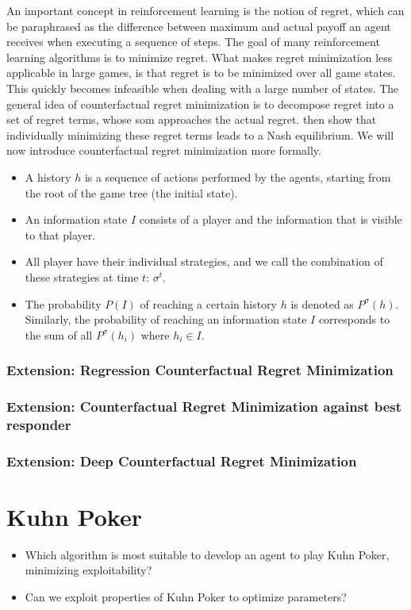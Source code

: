 \documentclass[10pt,a4paper]{article}
\begin{document}
An important concept in reinforcement learning is the notion of regret, which can be paraphrased as the difference between maximum and actual payoff an agent receives when executing a sequence of steps. The goal of many reinforcement learning algorithms is to minimize regret. What makes regret minimization less applicable in large games, is that regret is to be minimized over all game states. This quickly becomes infeasible when dealing with a large number of states. The general idea of counterfactual regret minimization is to decompose regret into a set of regret terms, whose som approaches the actual regret. \citeauthor{cfr} then show that individually minimizing these regret terms leads to a Nash equilibrium. We will now introduce counterfactual regret minimization more formally.\\

\begin{itemize}
\item{A history $h$ is a sequence of actions performed by the agents, starting from the root of the game tree (the initial state). }
\item{An information state $I$ consists of a player and the information that is visible to that player.}
\item{All player have their individual strategies, and we call the combination of these strategies at time $t$: $\sigma^t$.}
\item{The probability $P(I)$ of reaching a certain history $h$ is denoted as $P^{\sigma}(h)$. Similarly, the probability of reaching an information state $I$ corresponds to the sum of all $P^{\sigma}(h_i)$ where $h_i \in I$.}


\end{itemize}

\subsubsection{Extension: Regression Counterfactual Regret Minimization}
\subsubsection{Extension: Counterfactual Regret Minimization against best responder}
\subsubsection{Extension: Deep Counterfactual Regret Minimization}


\section{Kuhn Poker}
\begin{tcolorbox}
\begin{itemize}
\item{Which algorithm is most suitable to develop an agent to play Kuhn Poker, minimizing exploitability?}
\item{Can we exploit properties of Kuhn Poker to optimize parameters?}
\end{itemize}
\end{tcolorbox}
\end{document}
